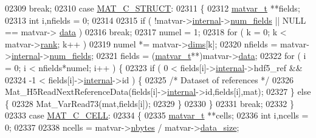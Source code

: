 \begin{DoxyCode}
{{{{{{{{{{02309             \textcolor{keywordflow}{break};
02310         \textcolor{keywordflow}{case} \hyperlink{group___m_a_t_ggad4d60ae7b709fc81bfd744fb4c857c40acb467c7749c80902b798134c729bb521}{MAT\_C\_STRUCT}:
02311         \{
02312             \hyperlink{group___m_a_t_structmatvar__t}{matvar\_t} **fields;
02313             \textcolor{keywordtype}{int} i,nfields = 0;
02314 
02315             \textcolor{keywordflow}{if} ( !matvar->\hyperlink{group___m_a_t_a6e97e3ed9f40c49322c18561c2a94e92}{internal}->\hyperlink{structmatvar__internal_a93fc447484f455eddf9334f2e9e411c2}{num\_fields} || NULL == matvar->
      \hyperlink{group___m_a_t_a5672978efa230bbdecdf38ede781f7fa}{data} )
02316                 \textcolor{keywordflow}{break};
02317             numel = 1;
02318             \textcolor{keywordflow}{for} ( k = 0; k < matvar->\hyperlink{group___m_a_t_a84ba70c96ded13cc555fa75b768d9921}{rank}; k++ )
02319                 numel *= matvar->\hyperlink{group___m_a_t_a8e01234e1c862ce3472bb37f5a09b92c}{dims}[k];
02320             nfields = matvar->\hyperlink{group___m_a_t_a6e97e3ed9f40c49322c18561c2a94e92}{internal}->\hyperlink{structmatvar__internal_a93fc447484f455eddf9334f2e9e411c2}{num\_fields};
02321             fields  = (\hyperlink{group___m_a_t_structmatvar__t}{matvar\_t}**)matvar->\hyperlink{group___m_a_t_a5672978efa230bbdecdf38ede781f7fa}{data};
02322             \textcolor{keywordflow}{for} ( i = 0; i < nfields*numel; i++ ) \{
02323                 \textcolor{keywordflow}{if} (  0 < fields[i]->\hyperlink{namespaceinternal}{internal}->hdf5\_ref &&
02324                      -1 < fields[i]->\hyperlink{group___m_a_t_a6e97e3ed9f40c49322c18561c2a94e92}{internal}->id ) \{
02325                     \textcolor{comment}{/* Dataset of references */}
02326                     Mat\_H5ReadNextReferenceData(fields[i]->\hyperlink{namespaceinternal}{internal}->id,fields[i],mat);
02327                 \} \textcolor{keywordflow}{else} \{
02328                     Mat\_VarRead73(mat,fields[i]);
02329                 \}
02330             \}
02331             \textcolor{keywordflow}{break};
02332         \}
02333         \textcolor{keywordflow}{case} \hyperlink{group___m_a_t_ggad4d60ae7b709fc81bfd744fb4c857c40a2f7abb47a1c51e248bd4e5e03cc81b08}{MAT\_C\_CELL}:
02334         \{
02335             \hyperlink{group___m_a_t_structmatvar__t}{matvar\_t} **cells;
02336             \textcolor{keywordtype}{int} i,ncells = 0;
02337 
02338             ncells = matvar->\hyperlink{group___m_a_t_abf1c844540503be2df9bb3db93cfe307}{nbytes} / matvar->\hyperlink{group___m_a_t_a9ad1c82e2b568da617e12dc73a26e1f9}{data\_size};
}}}}}}}}}}
\end{DoxyCode}
